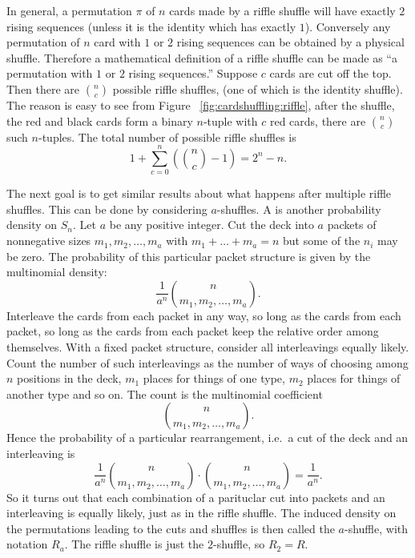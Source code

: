 \documentclass[12pt]{article}
\begin{document}
In general, a permutation \( \pi \) of \( n \) cards made by a riffle
shuffle will have exactly \( 2 \) rising sequences (unless it is the
identity which has exactly \( 1 \)).  Conversely any permutation of \( n
\) card with \( 1 \) or \( 2 \) rising sequences can be obtained by a
physical shuffle. Therefore a mathematical definition of a riffle
shuffle can be made as ``a permutation with \( 1 \) or \( 2 \) rising
sequences.'' Suppose \( c \) cards are cut off the top.  Then there are \(
\binom{n}{c} \) possible riffle shuffles, (one of which is the identity
shuffle).  The reason is easy to see from Figure~%
\ref{fig:cardshuffling:riffle}, after the shuffle, the red and black
cards form a binary \( n \)-tuple with \( c \) red cards, there are \(
\binom{n}{c} \) such \( n \)-tuples.  The total number of possible
riffle shuffles is
\[
    1 + \sum\limits_{c=0}^n \left( \binom{n}{c} - 1\right) = 2^n - n.
\]

The next goal is to get similar results about what happens after
multiple riffle shuffles.  This can be done by considering \( a \)-shuffles.
A  is another probability density on \( S_n \).
Let \( a \) be any positive integer.  Cut the deck into \( a \) packets
of nonnegative sizes \( m_1, m_2, \dots, m_a \) with \( m_1 + \dots + m_a
= n \) but some of the \( n_i \) may be zero.  The probability of this
particular packet structure is given by the multinomial density:
\[
    \frac{1}{a^n} \binom{n}{m_1, m_2, \dots, m_a}.
\] Interleave the cards from each packet in any way, so long as the
cards from each packet, so long as the cards from each packet keep the
relative order among themselves.  With a fixed packet structure,
consider all interleavings equally likely.  Count the number of such
interleavings as the number of ways of choosing among \( n \) positions
in the deck, \( m_1 \) places for things of one type, \( m_2 \) places
for things of another type and so on.  The count is the multinomial
coefficient
\[
    \binom{n}{m_1, m_2, \dots, m_a}.
\] Hence the probability of a particular rearrangement, i.e.\ a cut of
the deck and an interleaving is
\[
    \frac{1}{a^n} \binom{n}{m_1, m_2, \dots, m_a} \cdot \binom{n}{m_1, m_2,
    \dots, m_a} = \frac{1}{a^n}.
\] So it turns out that each combination of a parituclar cut into
packets and an interleaving is equally likely, just as in the riffle
shuffle.  The induced density on the permutations leading to the cuts
and shuffles is then called the \( a \)-shuffle,%
with notation \( R_a \).  The riffle shuffle is just the \( 2 \)-shuffle,
so \( R_2 = R \).
\end{document}
